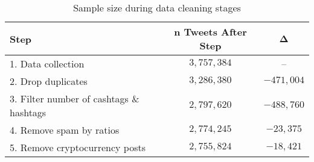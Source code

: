 \begin{table}[!ht]
	\centering
	\begin{tabular}{lcc}
		\toprule
		\textbf{Step} & \textbf{$\bm{n}$ Tweets After Step} & $\bm{\Delta}$ \\
		\midrule
		1. Data collection & $3,757,384$ & -- \\
		2. Drop duplicates & $3,286,380$ & $-471,004$ \\
		3. Filter number of cashtags \& hashtags & $2,797,620$ & $-488,760$ \\
		4. Remove spam by ratios & $2,774,245$ & $-23,375$ \\
		5. Remove cryptocurrency posts & $2,755,824$ & $-18,421$\\
		\bottomrule
	\end{tabular}
	\caption{Sample size during data cleaning stages}
	\label{table-samplesize-datacleaning}
\end{table}